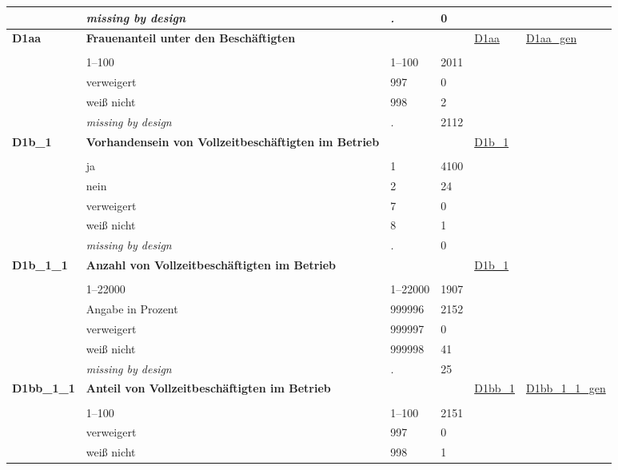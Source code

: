 \begin{longtable}{| L{2.45cm} | L{6cm} | C{1.5cm} | R{1cm} | C{2.25cm} | C{2.25cm} |}
   & \textit{missing by design} & \textit{.} & 0 &  &  \\ 
   \midrule
\textbf{D1aa}\label{var:D1aa} & \textbf{Frauenanteil unter den Beschäftigten} &  &  & \hyperref[D1aa]{D1aa} & \hyperref[var:suf:D1aa:gen]{D1aa\_gen} \\ 
   &  &  &  &  &  \\ 
   & 1--100 & 1--100 & 2011 &  &  \\ 
   & verweigert & 997 & 0 &  &  \\ 
   & weiß nicht & 998 & 2 &  &  \\ 
   & \textit{missing by design} & \textit{.} & 2112 &  &  \\ 
   \midrule
\textbf{D1b\_1}\label{var:D1b:1} & \textbf{Vorhandensein von Vollzeitbeschäftigten im Betrieb} &  &  & \hyperref[D1b:1]{D1b\_1} & \hyperref[var:suf:]{} \\ 
   &  &  &  &  &  \\ 
   & ja & 1 & 4100 &  &  \\ 
   & nein & 2 & 24 &  &  \\ 
   & verweigert & 7 & 0 &  &  \\ 
   & weiß nicht & 8 & 1 &  &  \\ 
   & \textit{missing by design} & \textit{.} & 0 &  &  \\ 
   \midrule
\textbf{D1b\_1\_1}\label{var:D1b:1:1} & \textbf{Anzahl von Vollzeitbeschäftigten im Betrieb} &  &  & \hyperref[D1b:1]{D1b\_1} & \hyperref[var:suf:]{} \\ 
   &  &  &  &  &  \\ 
   & 1--22000 & 1--22000 & 1907 &  &  \\ 
   & Angabe in Prozent & 999996 & 2152 &  &  \\ 
   & verweigert & 999997 & 0 &  &  \\ 
   & weiß nicht & 999998 & 41 &  &  \\ 
   & \textit{missing by design} & \textit{.} & 25 &  &  \\ 
   \midrule
\textbf{D1bb\_1\_1}\label{var:D1bb:1:1} & \textbf{Anteil von Vollzeitbeschäftigten im Betrieb} &  &  & \hyperref[D1bb:1]{D1bb\_1} & \hyperref[var:suf:D1bb:1:1:gen]{D1bb\_1\_1\_gen} \\ 
   &  &  &  &  &  \\ 
   & 1--100 & 1--100 & 2151 &  &  \\ 
   & verweigert & 997 & 0 &  &  \\ 
   & weiß nicht & 998 & 1 &  &  \\ 

\end{longtable}
